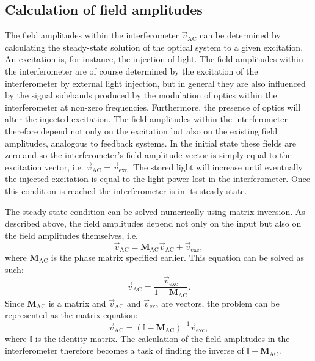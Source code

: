 \subsection{Calculation of field amplitudes}
The field amplitudes within the interferometer $\vec{v}_{\text{AC}}$ can be determined by calculating the steady-state solution of the optical system to a given excitation. An excitation is, for instance, the injection of light. The field amplitudes within the interferometer are of course determined by the excitation of the interferometer by external light injection, but in general they are also influenced by the signal sidebands produced by the modulation of optics within the interferometer at non-zero frequencies. Furthermore, the presence of optics will alter the injected excitation. The field amplitudes within the interferometer therefore depend not only on the excitation but also on the existing field amplitudes, analogous to feedback systems. In the initial state these fields are zero and so the interferometer's field amplitude vector is simply equal to the excitation vector, i.e. $\vec{v}_{\text{AC}} = \vec{v}_{\text{exc}}$. The stored light will increase until eventually the injected excitation is equal to the light power lost in the interferometer. Once this condition is reached the interferometer is in its steady-state.

The steady state condition can be solved numerically using matrix inversion. As described above, the field amplitudes depend not only on the input but also on the field amplitudes themselves, i.e.
\begin{equation}
  \vec{v}_{\text{AC}} = \mathbf{M}_{\text{AC}} \vec{v}_{\text{AC}} + \vec{v}_{\text{exc}},
\end{equation}
where $\mathbf{M}_{\text{AC}}$ is the phase matrix specified earlier. This equation can be solved as such:
\begin{equation}
  \vec{v}_{\text{AC}} = \frac{\vec{v}_{\text{exc}}}{1 - \mathbf{M}_{\text{AC}}}.
\end{equation}
Since $\mathbf{M}_{\text{AC}}$ is a matrix and $\vec{v}_{\text{AC}}$ and $\vec{v}_{\text{exc}}$ are vectors, the problem can be represented as the matrix equation:
\begin{equation}
  \vec{v}_{\text{AC}} = \left( \mathbb{I} - \mathbf{M}_{\text{AC}} \right)^{-1} \vec{v}_{\text{exc}},
\end{equation}
where $\mathbb{I}$ is the identity matrix. The calculation of the field amplitudes in the interferometer therefore becomes a task of finding the inverse of $\mathbb{I} - \mathbf{M}_{\text{AC}}$.

